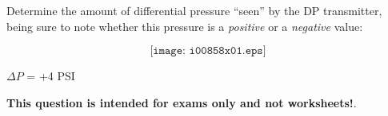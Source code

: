 

Determine the amount of differential pressure ``seen'' by the DP transmitter, being sure to note whether this pressure is a {\it positive} or a {\it negative} value:

$$\texttt{[image: i00858x01.eps]}$$







$\Delta P$ = +4 PSI







{\bf This question is intended for exams only and not worksheets!}.


